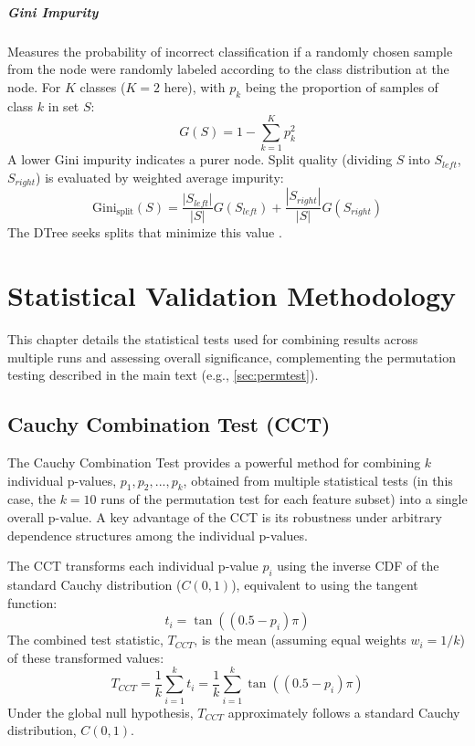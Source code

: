 \begin{appendices}
  \paragraph{Gini Impurity}
  Measures the probability of incorrect classification if a randomly chosen sample from the node were randomly labeled according to the class distribution at the node. For $K$ classes ($K = 2$ here), with $p_k$ being the proportion of samples of class $k$ in set $S$:
  \begin{equation}
    G(S) = 1 - \sum_{k=1}^{K} p_k^2
    \label{eq:gini_impurity}
  \end{equation}
  A lower Gini impurity indicates a purer node. Split quality (dividing $S$ into $S_{left}$, $S_{right}$) is evaluated by weighted average impurity:
  \begin{equation}
    \text{Gini}_{\text{split}}(S) = \frac{|S_{left}|}{|S|} G(S_{left}) + \frac{|S_{right}|}{|S|} G(S_{right})
    \label{eq:gini_split}
  \end{equation}
  The DTree seeks splits that minimize this value \autocite{breiman1984classification}.


  \chapter{Statistical Validation Methodology}
  \label{app:cct}

  This chapter details the statistical tests used for combining results across multiple runs and assessing overall significance, complementing the permutation testing described in the main text (e.g., \autoref{sec:permtest}).

  \section{Cauchy Combination Test (CCT)}
  \label{sec:cct_methodology}

  The Cauchy Combination Test \autocite{liu2020cauchy} provides a powerful method for combining $k$ individual p-values, $p_1, p_2, ..., p_k$, obtained from multiple statistical tests (in this case, the $k=10$ runs of the permutation test for each feature subset) into a single overall p-value. A key advantage of the CCT is its robustness under arbitrary dependence structures among the individual p-values.

  The CCT transforms each individual p-value $p_i$ using the inverse CDF of the standard Cauchy distribution ($C(0,1)$), equivalent to using the tangent function:
  \begin{equation}
    t_i = \tan\left( (0.5 - p_i) \pi \right)
    \label{eq:cct_transform}
  \end{equation}
  The combined test statistic, $T_{CCT}$, is the mean (assuming equal weights $w_i=1/k$) of these transformed values:
  \begin{equation}
    T_{CCT} = \frac{1}{k} \sum_{i=1}^k t_i = \frac{1}{k} \sum_{i=1}^k \tan\left( (0.5 - p_i) \pi \right)
    \label{eq:cct_statistic}
  \end{equation}
  Under the global null hypothesis, $T_{CCT}$ approximately follows a standard Cauchy distribution, $C(0,1)$.


\end{appendices}
